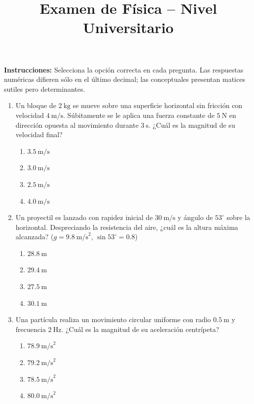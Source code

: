 \documentclass[12pt]{article}
\title{Examen de Física -- Nivel Universitario}
\author{}
\date{}
\begin{document}
\maketitle

\noindent
\textbf{Instrucciones:} Selecciona la opción correcta en cada pregunta. Las respuestas numéricas difieren sólo en el último decimal; las conceptuales presentan matices sutiles pero determinantes.

\begin{enumerate}

\item Un bloque de $2\ \text{kg}$ se mueve sobre una superficie horizontal sin fricción con velocidad $4\ \text{m/s}$. Súbitamente se le aplica una fuerza constante de $5\ \text{N}$ en dirección opuesta al movimiento durante $3\ \text{s}$. ¿Cuál es la magnitud de su velocidad final?
\begin{enumerate}[label=(\alph*)]
\item $3.5\ \text{m/s}$
\item $3.0\ \text{m/s}$
\item $2.5\ \text{m/s}$
\item $4.0\ \text{m/s}$
\end{enumerate}

\item Un proyectil es lanzado con rapidez inicial de $30\ \text{m/s}$ y ángulo de $53^\circ$ sobre la horizontal. Despreciando la resistencia del aire, ¿cuál es la altura máxima alcanzada? ($g = 9.8\ \text{m/s}^2$, $\sin53^\circ=0.8$)
\begin{enumerate}[label=(\alph*)]
\item $28.8\ \text{m}$
\item $29.4\ \text{m}$
\item $27.5\ \text{m}$
\item $30.1\ \text{m}$
\end{enumerate}

\item Una partícula realiza un movimiento circular uniforme con radio $0.5\ \text{m}$ y frecuencia $2\ \text{Hz}$. ¿Cuál es la magnitud de su aceleración centrípeta?
\begin{enumerate}[label=(\alph*)]
\item $78.9\ \text{m/s}^2$
\item $79.2\ \text{m/s}^2$
\item $78.5\ \text{m/s}^2$
\item $80.0\ \text{m/s}^2$
\end{enumerate}


\end{enumerate}
\end{document}
